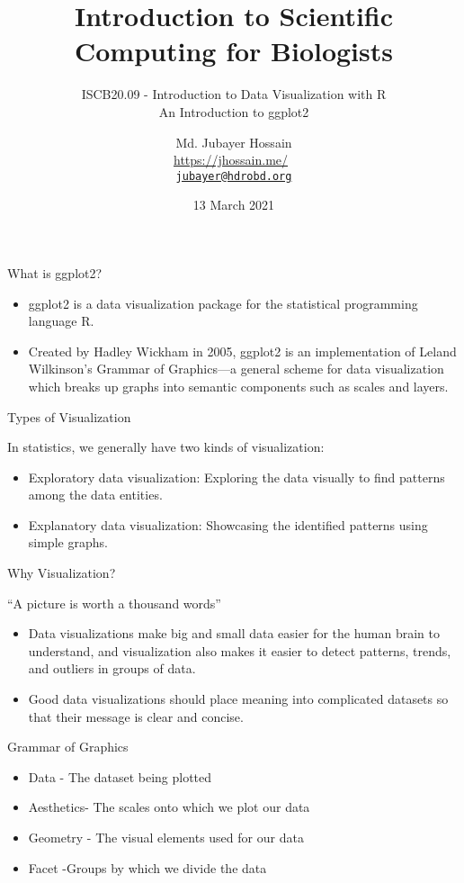 \documentclass[ignorenonframetext,aspectratio=169]{beamer}
\title{Introduction to Scientific Computing for Biologists}
\subtitle{ISCB20.09 - Introduction to Data Visualization with R\\
An Introduction to ggplot2}
\author{Md. Jubayer Hossain\\
\url{https://jhossain.me/}~\\
\href{mailto:jubayer@hdrobd.org}{\nolinkurl{jubayer@hdrobd.org}}}
\institute{Founder\\
Health Data Research Organization\\
Lead Organizer\\
Scientific Computing for Biologists}
\date{13 March 2021}
\providecommand{\tightlist}{%
  \setlength{\itemsep}{0pt}\setlength{\parskip}{0pt}}
\begin{document}
\frame{\titlepage}

\begin{frame}[t]{What is ggplot2?}
\protect\hypertarget{what-is-ggplot2}{}

\begin{itemize}
\tightlist
\item
  ggplot2 is a data visualization package for the statistical
  programming language R.
\item
  Created by Hadley Wickham in 2005, ggplot2 is an implementation of
  Leland Wilkinson's Grammar of Graphics---a general scheme for data
  visualization which breaks up graphs into semantic components such as
  scales and layers.
\end{itemize}

\end{frame}

\begin{frame}[t]{Types of Visualization}
\protect\hypertarget{types-of-visualization}{}

In statistics, we generally have two kinds of visualization:

\begin{itemize}
\tightlist
\item
  Exploratory data visualization: Exploring the data visually to find
  patterns among the data entities.
\item
  Explanatory data visualization: Showcasing the identified patterns
  using simple graphs.
\end{itemize}

\end{frame}

\begin{frame}[t]{Why Visualization?}
\protect\hypertarget{why-visualization}{}

``A picture is worth a thousand words''

\begin{itemize}
\tightlist
\item
  Data visualizations make big and small data easier for the human brain
  to understand, and visualization also makes it easier to detect
  patterns, trends, and outliers in groups of data.
\item
  Good data visualizations should place meaning into complicated
  datasets so that their message is clear and concise.
\end{itemize}

\end{frame}

\begin{frame}[t]{Grammar of Graphics}
\protect\hypertarget{grammar-of-graphics}{}

\begin{itemize}
\tightlist
\item
  Data - The dataset being plotted
\item
  Aesthetics- The scales onto which we plot our data
\item
  Geometry - The visual elements used for our data
\item
  Facet -Groups by which we divide the data
\end{itemize}

\end{frame}
\end{document}
